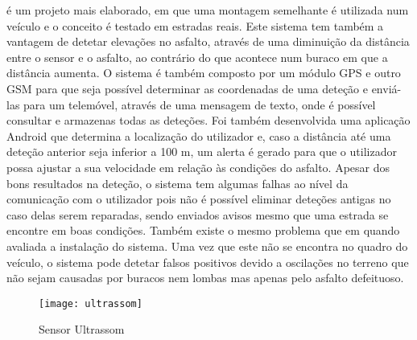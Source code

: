 \cite{Madli2015} é um projeto mais elaborado, em que uma montagem semelhante é utilizada num veículo e o conceito é testado em estradas reais.
Este sistema tem também a vantagem de detetar elevações no asfalto, através de uma diminuição da distância entre o sensor e o asfalto, ao contrário do que acontece num buraco em que a distância aumenta.
O sistema é também composto por um módulo GPS e outro GSM para que seja possível determinar as coordenadas de uma deteção e enviá-las para um telemóvel, através de uma mensagem de texto, onde é possível consultar e armazenas todas as deteções.
Foi também desenvolvida uma aplicação Android que determina a localização do utilizador e, caso a distância até uma deteção anterior seja inferior a 100 m, um alerta é gerado para que o utilizador possa ajustar a sua velocidade em relação às condições do asfalto.
Apesar dos bons resultados na deteção, o sistema tem algumas falhas ao nível da comunicação com o utilizador pois não é possível eliminar deteções antigas no caso delas serem reparadas, sendo enviados avisos mesmo que uma estrada se encontre em boas condições.
Também existe o mesmo problema que em \cite{Hegde2015} quando avaliada a instalação do sistema. Uma vez que este não se encontra no quadro do veículo, o sistema pode detetar falsos positivos devido a oscilações no terreno que não sejam causadas por buracos nem lombas mas apenas pelo asfalto defeituoso.

\begin{figure}[hbtp]
	\centering
	\texttt{[image: ultrassom]}
	\caption[Sensor Ultrassom]{Sensor Ultrassom \footnotemark}
	\label{fig:sensor_ultrassom}
\end{figure}


